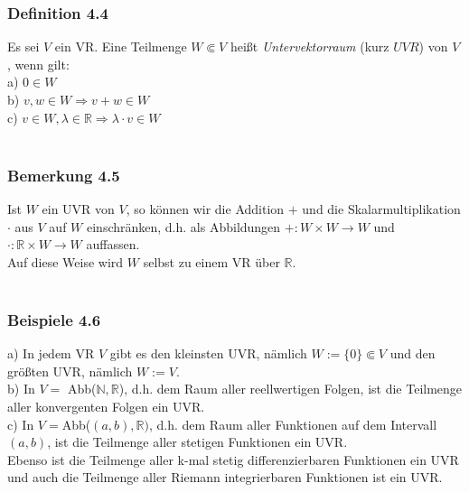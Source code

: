 \documentclass{article}
\begin{document}
\subsubsection*{Definition 4.4}
Es sei $V$ ein VR. Eine Teilmenge $W \Subset V$ heißt \textit{Untervektorraum} (kurz $\textit{UVR}$) von $V$, wenn gilt: \\
a) $0 \in W$ \\
b) $v,w \in W \Rightarrow v+w \in W$ \\
c) $v \in W, \lambda \in \mathbb{R} \Rightarrow \lambda \cdot v \in W$ \\
\\
\subsubsection*{Bemerkung 4.5}
Ist $W$ ein UVR von $V$, so können wir die Addition $+$ und die Skalarmultiplikation $\cdot$ aus $V$ auf $W$ einschränken, d.h. als Abbildungen $+: W \times W \rightarrow W$ und $\cdot: \mathbb{R} \times W \rightarrow W$ auffassen. \\
Auf diese Weise wird $W$ selbst zu einem VR über $\mathbb{R}$. \\
\\
\subsubsection*{Beispiele 4.6}
a) In jedem VR $V$ gibt es den kleinsten UVR, nämlich $W:= \{0\} \Subset V$ und den größten UVR, nämlich $W:= V$. \\
b) In $V =$ Abb($\mathbb{N}, \mathbb{R}$), d.h. dem Raum aller reellwertigen Folgen, ist die Teilmenge aller konvergenten Folgen ein UVR. \\
c) In $V = $Abb($(a,b), \mathbb{R})$, d.h. dem Raum aller Funktionen auf dem Intervall $(a,b)$, ist die Teilmenge aller stetigen Funktionen ein UVR. \\
Ebenso ist die Teilmenge aller k-mal stetig differenzierbaren Funktionen ein UVR und auch die Teilmenge aller Riemann integrierbaren Funktionen ist ein UVR. \\
\\
\end{document}

